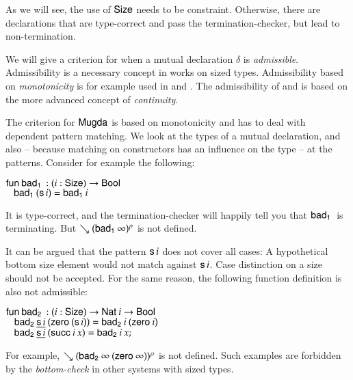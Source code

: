 As we will see, the use of $\mathsf{Size}$ needs to be constraint.
Otherwise, there are declarations that are type-correct and pass the termination-checker, but lead to non-termination.

We will give a criterion for when a mutual declaration $\delta$ is \emph{admissible}.
Admissibility is a necessary concept in works on sized types.
Admissibility based on \emph{monotonicity} is for example used in \cite{bgp:lpar06} and \cite{blanqui04typebased}.
The admissibility of \cite{abel:PhD} and \cite{hughes96proving} is based on the more advanced concept of \emph{continuity}.

The criterion for $\textsf{Mugda}$ is based on monotonicity and has to deal with dependent pattern matching. 
We look at the types of a mutual declaration, and also -- because matching on constructors has an influence on the type -- at the patterns. Consider for example the following:
\begin{bsp}
$\mathsf{fun}\: \mathsf{bad_1}\: : ( i : \mathsf{Size} ) \rightarrow{\mathsf{Bool}}$\\
$\hspace*{3mm} \mathsf{bad_1}\: (\mathsf{s}\, i) = \mathsf{bad_1}\: i $ 
\end{bsp}
It is type-correct, and the termination-checker will happily tell you that $\mathsf{bad_1}\:$ is terminating.
But $\searrow (\mathsf{bad_1}\: \infty)^{\rho}$ is not defined.

It can be argued that the pattern $\mathsf{s}\, i$ does not cover all cases: A hypothetical bottom size element would not match against $\mathsf{s}\, i$. Case distinction on a size should not be accepted.
For the same reason, the following function definition is also not admissible:
\begin{bsp}
$\mathsf{fun}\: \mathsf{bad_2}\: : ( i : \mathsf{Size} ) \rightarrow{\mathsf{Nat}\:i \rightarrow\mathsf{Bool}}$\\
$\hspace*{3mm} \mathsf{bad_2}\: \underline{\mathsf{s}\, i} \: (\mathsf{zero}\: (\mathsf{s}\, i)) = \mathsf{bad_2}\: i \: (\mathsf{zero}\: i)$\\
$\hspace*{3mm} \mathsf{bad_2}\: \underline{\mathsf{s}\, i}\: (\mathsf{succ}\: i \: x) = \mathsf{bad_2}\: i \: x;$
\end{bsp}
For example, $\searrow (\mathsf{bad_2}\: \infty \: (\mathsf{zero}\: \infty))^{\rho}$ is not defined.
Such examples are forbidden by the \emph{bottom-check} \cite{hughes96proving} in other systems with sized types.

